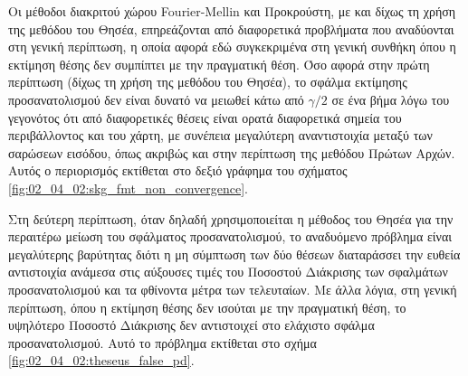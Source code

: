 Οι μέθοδοι διακριτού χώρου Fourier-Mellin και Προκρούστη, με και δίχως τη χρήση
της μεθόδου του Θησέα, επηρεάζονται από διαφορετικά προβλήματα που αναδύονται
στη γενική περίπτωση, η οποία αφορά εδώ συγκεκριμένα στη γενική συνθήκη όπου η
εκτίμηση θέσης δεν συμπίπτει με την πραγματική θέση. Όσο αφορά στην πρώτη
περίπτωση (δίχως τη χρήση της μεθόδου του Θησέα), το σφάλμα εκτίμησης
προσανατολισμού δεν είναι δυνατό να μειωθεί κάτω από $\gamma/2$ σε ένα βήμα
λόγω του γεγονότος ότι από διαφορετικές θέσεις είναι ορατά διαφορετικά σημεία
του περιβάλλοντος και του χάρτη, με συνέπεια μεγαλύτερη αναντιστοιχία μεταξύ
των σαρώσεων εισόδου, όπως ακριβώς και στην περίπτωση της μεθόδου Πρώτων Αρχών.
Αυτός ο περιορισμός εκτίθεται στο δεξιό γράφημα του σχήματος
\ref{fig:02_04_02:skg_fmt_non_convergence}.

Στη δεύτερη περίπτωση, όταν δηλαδή χρησιμοποιείται η μέθοδος του Θησέα για την
περαιτέρω μείωση του σφάλματος προσανατολισμού, το αναδυόμενο πρόβλημα είναι
μεγαλύτερης βαρύτητας διότι η μη σύμπτωση των δύο θέσεων διαταράσσει την ευθεία
αντιστοιχία ανάμεσα στις αύξουσες τιμές του Ποσοστού Διάκρισης των σφαλμάτων
προσανατολισμού και τα φθίνοντα μέτρα των τελευταίων. Με άλλα λόγια, στη γενική
περίπτωση, όπου η εκτίμηση θέσης δεν ισούται με την πραγματική θέση, το
υψηλότερο Ποσοστό Διάκρισης δεν αντιστοιχεί στο ελάχιστο σφάλμα
προσανατολισμού. Αυτό το πρόβλημα εκτίθεται στο σχήμα
\ref{fig:02_04_02:theseus_false_pd}.

